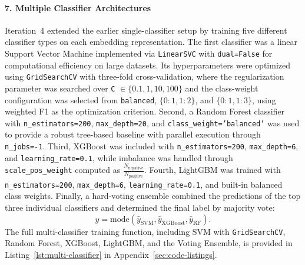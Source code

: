 \documentclass[11pt, titlepage, bibliography=totoc]{scrreprt}
\begin{document}
\paragraph{7. Multiple Classifier Architectures}
Iteration~4 extended the earlier single-classifier setup by training five different classifier types on each embedding representation. The first classifier was a linear Support Vector Machine implemented via \texttt{LinearSVC} with \texttt{dual=False} for computational efficiency on large datasets. Its hyperparameters were optimized using \texttt{GridSearchCV} with three-fold cross-validation, where the regularization parameter was searched over \texttt{C} $\in \{0.1, 1, 10, 100\}$ and the class-weight configuration was selected from \texttt{balanced}, $\{0:1, 1:2\}$, and $\{0:1, 1:3\}$, using weighted F1 as the optimization criterion. Second, a Random Forest classifier with \texttt{n\_estimators=200}, \texttt{max\_depth=20}, and \texttt{class\_weight='balanced'} was used to provide a robust tree-based baseline with parallel execution through \texttt{n\_jobs=-1}. Third, XGBoost was included with \texttt{n\_estimators=200}, \texttt{max\_depth=6}, and \texttt{learning\_rate=0.1}, while imbalance was handled through \texttt{scale\_pos\_weight} computed as $\frac{N_{\text{negative}}}{N_{\text{positive}}}$. Fourth, LightGBM was trained with \texttt{n\_estimators=200}, \texttt{max\_depth=6}, \texttt{learning\_rate=0.1}, and built-in balanced class weights. Finally, a hard-voting ensemble combined the predictions of the top three individual classifiers and determined the final label by majority vote:
\begin{equation}
\hat{y} = \text{mode}(\hat{y}_{\text{SVM}}, \hat{y}_{\text{XGBoost}}, \hat{y}_{\text{RF}}).
\end{equation}
The full multi-classifier training function, including SVM with \texttt{GridSearchCV}, Random Forest, XGBoost, LightGBM, and the Voting Ensemble, is provided in Listing~\ref{lst:multi-classifier} in Appendix~\ref{sec:code-listings}.
\end{document}
